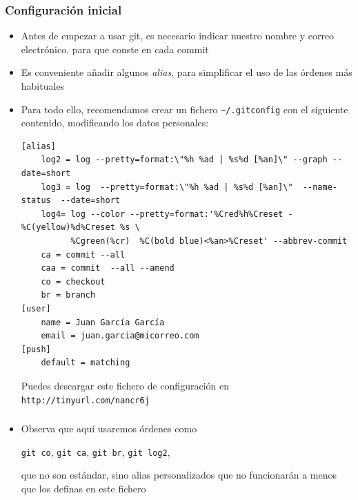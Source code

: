 \documentclass[ucs]{beamer}
\begin{document}
\begin{frame}[fragile]
\frametitle{Configuración inicial }
\begin{itemize}
\item
Antes de empezar a usar git, es necesario indicar nuestro nombre y correo
electrónico, para que conste en cada commit
\item
Es conveniente añadir algunos \emph{alias}, para simplificar el
uso de las órdenes más habituales
\item
Para todo ello, recomendamos crear un fichero \verb|~/.gitconfig| con el
siguiente contenido, modificando los datos personales:
  \begin{tiny}
  \begin{verbatim}
[alias]
    log2 = log --pretty=format:\"%h %ad | %s%d [%an]\" --graph --date=short
    log3 = log  --pretty=format:\"%h %ad | %s%d [%an]\"  --name-status  --date=short
    log4= log --color --pretty=format:'%Cred%h%Creset -%C(yellow)%d%Creset %s \ 
          %Cgreen(%cr)  %C(bold blue)<%an>%Creset' --abbrev-commit
    ca = commit --all
    caa = commit  --all --amend
    co = checkout 
    br = branch
[user]
    name = Juan García García
    email = juan.garcia@micorreo.com
[push]
    default = matching

  \end{verbatim}
Puedes descargar este fichero
de configuración en
\verb|http://tinyurl.com/nancr6j|

  \end{tiny}
\end{itemize}

\end{frame}



\begin{frame}[fragile]
\frametitle{}
\begin{itemize}


\item
Observa que aquí usaremos órdenes como

\verb|git co|,
\verb|git ca|,
\verb|git br|,
\verb|git log2|,

que no son estándar, sino alias personalizados que no funcionarán
a menos que los definas en este fichero

\end{itemize}

\end{frame}
\end{document}
